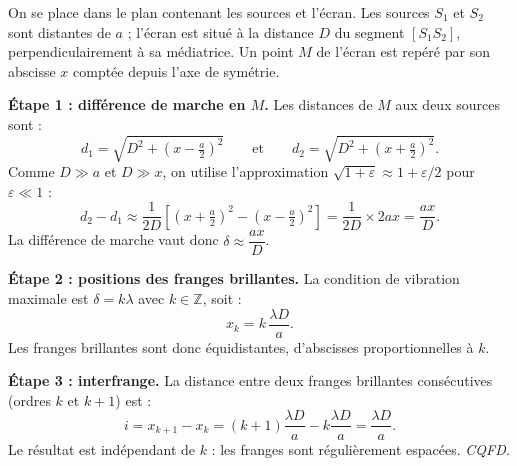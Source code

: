\documentclass[11pt]{article}
\begin{document}
\begin{experience}[Démonstration guidée de $i = \lambda D/a$]
On se place dans le plan contenant les sources et l'écran. Les sources $S_1$ et $S_2$ sont distantes de $a$ ; l'écran est situé à la distance $D$ du segment $[S_1S_2]$, perpendiculairement à sa médiatrice. Un point $M$ de l'écran est repéré par son abscisse $x$ comptée depuis l'axe de symétrie.

\textbf{Étape 1 : différence de marche en $M$.} Les distances de $M$ aux deux sources sont :
\[ d_1 = \sqrt{D^2 + \left(x - \tfrac{a}{2}\right)^2} \qquad \text{et} \qquad d_2 = \sqrt{D^2 + \left(x + \tfrac{a}{2}\right)^2}. \]
Comme $D \gg a$ et $D \gg x$, on utilise l'approximation $\sqrt{1+\varepsilon} \approx 1 + \varepsilon/2$ pour $\varepsilon \ll 1$ :
\[ d_2 - d_1 \approx \frac{1}{2D}\left[\left(x+\tfrac{a}{2}\right)^2 - \left(x-\tfrac{a}{2}\right)^2\right] = \frac{1}{2D}\times 2ax = \frac{ax}{D}. \]
La différence de marche vaut donc $\boxed{\delta \approx \dfrac{ax}{D}}$.

\textbf{Étape 2 : positions des franges brillantes.} La condition de vibration maximale est $\delta = k\lambda$ avec $k \in \mathbb{Z}$, soit :
\[ x_k = k\,\frac{\lambda D}{a}. \]
Les franges brillantes sont donc équidistantes, d'abscisses proportionnelles à $k$.

\textbf{Étape 3 : interfrange.} La distance entre deux franges brillantes consécutives (ordres $k$ et $k+1$) est :
\[ i = x_{k+1} - x_k = (k+1)\frac{\lambda D}{a} - k\frac{\lambda D}{a} = \frac{\lambda D}{a}. \]
Le résultat est indépendant de $k$ : les franges sont régulièrement espacées. \emph{CQFD.}
\end{experience}
\end{document}
